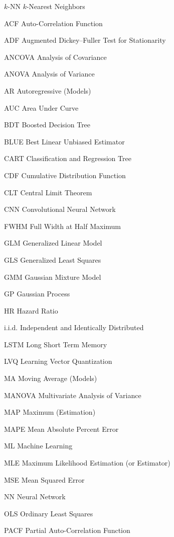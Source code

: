 \begin{symbollist}
  \item[$k$-NN] $k$-Nearest Neighbors
  \item[ACF] Auto-Correlation Function
  \item[ADF] Augmented Dickey--Fuller Test for Stationarity
  \item[ANCOVA] Analysis of Covariance
  \item[ANOVA] Analysis of Variance
  \item[AR] Autoregressive (Models)
  \item[AUC] Area Under Curve
  \item[BDT] Boosted Decision Tree
  \item[BLUE] Best Linear Unbiased Estimator
  \item[CART] Classification and Regression Tree
  \item[CDF] Cumulative Distribution Function
  \item[CLT] Central Limit Theorem
  \item[CNN] Convolutional Neural Network
  \item[FWHM] Full Width at Half Maximum
  \item[GLM] Generalized Linear Model
  \item[GLS] Generalized Least Squares
  \item[GMM] Gaussian Mixture Model
  \item[GP] Gaussian Process
  \item[HR] Hazard Ratio
  \item[i.i.d.] Independent and Identically Distributed
  \item[LSTM] Long Short Term Memory
  \item[LVQ] Learning Vector Quantization
  \item[MA] Moving Average (Models)
  \item[MANOVA] Multivariate Analysis of Variance
  \item[MAP] Maximum \aposteriori (Estimation)
  \item[MAPE] Mean Absolute Percent Error
  \item[ML] Machine Learning
  \item[MLE] Maximum Likelihood Estimation (or Estimator)
  \item[MSE] Mean Squared Error
  \item[NN] Neural Network
  \item[OLS] Ordinary Least Squares
  \item[PACF] Partial Auto-Correlation Function

\end{symbollist}
